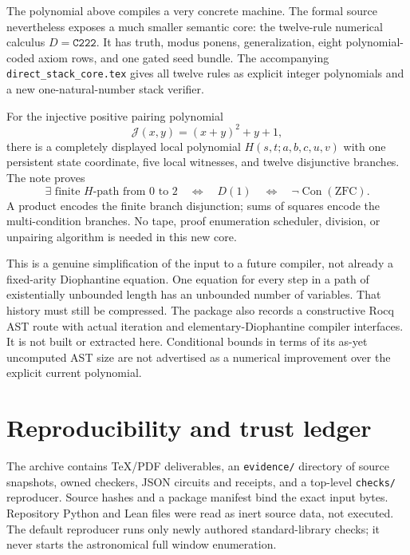 \documentclass[11pt]{article}
\newcommand{\Con}{\operatorname{Con}}
\begin{document}
The polynomial above compiles a very concrete machine. The formal source nevertheless exposes a much smaller semantic core: the twelve-rule numerical calculus \(D=\texttt{C222}\). It has truth, modus ponens, generalization, eight polynomial-coded axiom rows, and one gated seed bundle. The accompanying \texttt{direct\_stack\_core.tex} gives all twelve rules as explicit integer polynomials and a new one-natural-number stack verifier.

For the injective positive pairing polynomial
\[
 \mathcal J(x,y)=(x+y)^2+y+1,
\]
there is a completely displayed local polynomial \(H(s,t;a,b,c,u,v)\) with one persistent state coordinate, five local witnesses, and twelve disjunctive branches. The note proves
\[
 \exists\text{ finite }H\text{-path from }0\text{ to }2
 \quad\Longleftrightarrow\quad D(1)
 \quad\Longleftrightarrow\quad\neg\Con(\mathrm{ZFC}).
\]
A product encodes the finite branch disjunction; sums of squares encode the multi-condition branches. No tape, proof enumeration scheduler, division, or unpairing algorithm is needed in this new core.

This is a genuine simplification of the input to a future compiler, not already a fixed-arity Diophantine equation. One equation for every step in a path of existentially unbounded length has an unbounded number of variables. That history must still be compressed. The package also records a constructive Rocq AST route with actual iteration and elementary-Diophantine compiler interfaces. It is not built or extracted here. Conditional bounds in terms of its as-yet uncomputed AST size are not advertised as a numerical improvement over the explicit current polynomial.

\section{Reproducibility and trust ledger}

The archive contains TeX/PDF deliverables, an \texttt{evidence/} directory of source snapshots, owned checkers, JSON circuits and receipts, and a top-level \texttt{checks/} reproducer. Source hashes and a package manifest bind the exact input bytes. Repository Python and Lean files were read as inert source data, not executed. The default reproducer runs only newly authored standard-library checks; it never starts the astronomical full window enumeration.
\end{document}
